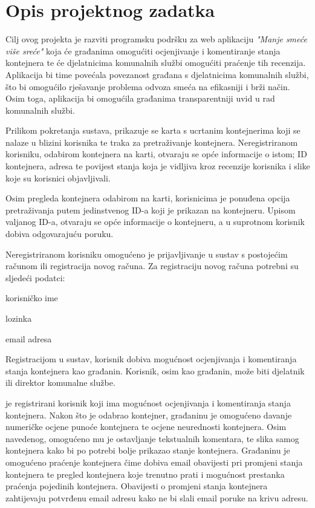 \chapter{Opis projektnog zadatka}
		
		Cilj ovog projekta je razviti programsku podršku za web aplikaciju \textit{"Manje smeće više sreće"} koja će građanima omogućiti ocjenjivanje i komentiranje stanja kontejnera te će djelatnicima komunalnih službi omogućiti praćenje tih recenzija.
		Aplikacija bi time povećala povezanost građana s djelatnicima komunalnih službi, što bi omogućilo rješavanje problema odvoza smeća na efikasniji i brži način. 
		Osim toga, aplikacija bi omogućila građanima transparentniji uvid u rad komunalnih službi.
		
		Prilikom pokretanja sustava, prikazuje se karta s ucrtanim kontejnerima koji se nalaze u blizini korisnika te traka za pretraživanje kontejnera.
		Neregistriranom korisniku, odabirom kontejnera na karti, otvaraju se opće informacije o istom; ID kontejnera, adresa te povijest stanja koja je vidljiva kroz recenzije korisnika i slike koje su korisnici objavljivali.
		
		Osim pregleda kontejnera odabirom na karti, korisnicima je ponuđena opcija pretraživanja putem jedinstvenog ID-a koji je prikazan na kontejneru.
		Upisom valjanog ID-a, otvaraju se opće informacije o kontejneru, a u suprotnom korisnik dobiva odgovarajuću poruku.
		
		Neregistriranom korisniku omogućeno je prijavljivanje u sustav s postojećim računom ili registracija novog računa.
		Za registraciju novog računa potrebni su sljedeći podatci:
		\begin{packed_item}
			
			\item  korisničko ime
			\item  lozinka
			\item  email adresa
			
		\end{packed_item}
		
		Registracijom u sustav, korisnik dobiva mogućnost ocjenjivanja i komentiranja stanja kontejnera kao građanin. 
		Korisnik, osim kao građanin, može biti djelatnik ili direktor komunalne službe.
		
		 je registrirani korisnik koji ima mogućnost ocjenjivanja i komentiranja stanja kontejnera. 
		Nakon što je odabrao kontejner, građaninu je omogućeno davanje numeričke ocjene punoće kontejnera te ocjene neurednosti kontejnera.
		Osim navedenog, omogućeno mu je ostavljanje tekstualnih komentara, te slika samog kontejnera kako bi po potrebi bolje prikazao stanje kontejnera.
		Građaninu je omogućeno praćenje kontejnera čime dobiva email obavijesti pri promjeni stanja kontejnera te pregled kontejnera koje trenutno prati i mogućnost prestanka praćenja pojedinih kontejnera. 
		Obavijesti o promjeni stanja kontejnera zahtijevaju potvrđenu email adresu kako ne bi slali email poruke na krivu adresu. 
		
